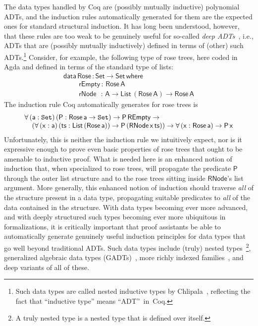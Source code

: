 \documentclass[9pt]{entcs}
\newcommand{\set}{\mathtt{Set}}
\begin{document}
The data types handled by Coq are (possibly mutually inductive)
polynomial ADTs, and the induction rules automatically generated for
them are the expected ones for standard structural induction. It has
long been understood, however, that these rules are too weak to be
genuinely useful for so-called {\em deep ADTs}~\cite{jp20}, i.e., ADTs
that are (possibly mutually inductively) defined in terms of (other)
such ADTs.\footnote{Such data types are called nested inductive types
  by Chlipala~\cite{chl}, reflecting the fact that ``inductive type''
  means ``ADT''~in~Coq.} Consider, for example, the following type of
rose trees, here coded in Agda and defined in terms of the standard
type of lists:
\[\begin{array}{l}
\mathsf{data\, Rose\, : Set \to Set\,where}\\
\mathsf{\;\;\;\;\;\;\;\;rEmpty\, :\, Rose\,A}\\
\mathsf{\;\;\;\;\;\;\;\;rNode\,\,\,\, :\, A \to List\,(Rose\,A) \to Rose\,A} 
\end{array}\]
\noindent
The induction rule Coq automatically generates for rose trees is
\[\begin{array}{l}
\mathsf{\forall\, (a : \set)\,(P : Rose\,a \to \set) \to P\,REmpty \to}\\
\mathsf{\hspace*{0.15in}
 (\forall\, (x : a)\,(ts :
  List\,(Rose\,a)) \to P\,(RNode\,x\,ts)) \to 
  \forall \,(x : Rose\,a) \to P\,x}
\end{array}\]
\noindent
Unfortunately, this is neither the induction rule we intuitively
expect, nor is it expressive enough to prove even basic properties of
rose trees that ought to be amenable to inductive proof. What is
needed here is an enhanced notion of induction that, when specialized
to rose trees, will propagate the predicate $\mathsf{P}$ through the
outer list structure and to the rose trees sitting inside
$\mathsf{RNode}$'s list argument. More generally, this enhanced notion
of induction should traverse {\em all} of the structure present in a
data type, propagating suitable predicates to {\em all} of the data
contained in the structure. With data types becoming ever more
advanced, and with deeply structured such types becoming ever more
ubiquitous in formalizations, it is critically important that proof
assistants
be able to automatically generate genuinely useful induction
principles for data types that go well beyond traditional ADTs. Such
data types include (truly) nested types~\cite{bm98}\footnote{A truly
  nested type is a nested type that is defined over itself.},
generalized algebraic data types
(GADTs)~\cite{ch03,pvww06,sp04,xcc03}, more richly indexed
families~\cite{ch88}, and deep variants of all of these.
\end{document}
